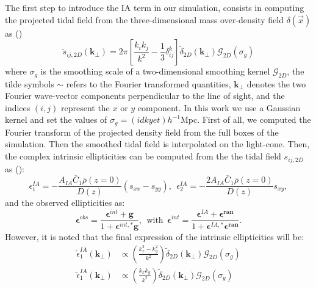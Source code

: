 \documentclass[twocolumn,twocolappendix]{aastex63}
\begin{document}
The first step to introduce the IA term in our simulation, consists in computing the projected tidal field from the three-dimensional mass over-density field $\delta(\vec{x})$
as (\cite{harnois2021cosmic})
\begin{equation}
   \tilde{s}_{ij,2D}(\textbf{k}_{\bot})=
   2 \pi 	\left [ \frac{k_ik_j}{k^2}- \frac{1}{3} \delta_{ij}^k  \right ]
  \tilde{\delta}_{2D}(\textbf{k}_{\bot})
   \mathcal{G}_{2D}(\sigma_g)
\end{equation}
where $\sigma_g$ is the smoothing scale of a two-dimensional smoothing kernel $\mathcal{G}_{2D}$, the tilde symbols $\sim $ refers to the Fourier transformed quantities, $\textbf{k}_{\bot}$ denotes the two Fourier wave-vector components perpendicular to the line of sight, and the indices $(i,j)$ represent the $x$ or $y$ component.
In this work we use a Gaussian kernel and set the values of $\sigma_g=(idk yet) h^{-1}$Mpc.
First of all, we computed the Fourier transform of the projected density field from the full boxes of the simulation. 
Then the smoothed tidal field is interpolated on the light-cone. 
Then, the complex intrinsic ellipticities can be computed from the the tidal field $s_{ij,2D}$ as (\cite{harnois2021cosmic}):
\begin{equation}\label{complex_el}
    \epsilon_{1}^{IA}=- \frac{A_{IA}\bar{C}_1\bar{\rho}(z=0)}{D(z)} (s_{xx}-s_{yy}), \ \ 
      \epsilon_{2}^{IA}=-\frac{2A_{IA}\bar{C}_1\bar{\rho}(z=0)}{D(z)} s_{xy},
\end{equation}
and the observed ellipticities as:
\begin{equation}
    \boldsymbol{\epsilon}^{obs}=
    \frac{\boldsymbol{\epsilon}^{int}+\textbf{g}}{1+\boldsymbol{\epsilon}^{int,*}\textbf{g}}, \ \  \text{with}  \ \
    \boldsymbol{\epsilon}^{int}=
    \frac{\boldsymbol{\epsilon}^{
     IA}+\boldsymbol{\epsilon^{ran}}}
     {1+\boldsymbol{\epsilon}^{IA,*}\boldsymbol{\epsilon^{ran}}}.
\end{equation}
However, it is noted that the final expression of the intrinsic ellipticities will be:
\begin{align}
    \tilde{ \epsilon}_{1}^{IA}(\textbf{k}_{\bot}) & \propto
    \left ( \frac{k_x^2-k_y^2}{k^2} \right )  \tilde{\delta}_{2D}(\textbf{k}_{\bot})
   \mathcal{G}_{2D}(\sigma_g) \\
       \tilde{ \epsilon}_{1}^{IA}(\textbf{k}_{\bot}) & \propto
    \left ( \frac{k_x k_y}{k^2} \right )  \tilde{\delta}_{2D}(\textbf{k}_{\bot})
   \mathcal{G}_{2D}(\sigma_g) \nonumber
\end{align}
\end{document}
